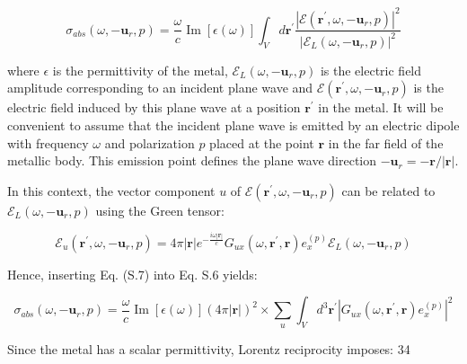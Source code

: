 \documentclass[10pt]{article}
\begin{document}
\begin{equation*}
\sigma_{a b s}\left(\omega,-\boldsymbol{u}_{r}, p\right)=\frac{\omega}{c} \operatorname{Im}[\epsilon(\omega)] \int_{V} d \boldsymbol{r}^{\prime} \frac{\left|\mathcal{E}\left(\boldsymbol{r}^{\prime}, \omega,-\boldsymbol{u}_{r}, p\right)\right|^{2}}{\left|\mathcal{E}_{L}\left(\omega,-\boldsymbol{u}_{r}, p\right)\right|^{2}} \tag{S.6}
\end{equation*}


where $\epsilon$ is the permittivity of the metal, $\mathcal{E}_{L}\left(\omega,-\boldsymbol{u}_{r}, p\right)$ is the electric field amplitude corresponding to an incident plane wave and $\mathcal{E}\left(\boldsymbol{r}^{\prime}, \omega,-\boldsymbol{u}_{r}, p\right)$ is the electric field induced by this plane wave at a position $\boldsymbol{r}^{\prime}$ in the metal. It will be convenient to assume that the incident plane wave is emitted by an electric dipole with frequency $\omega$ and polarization $p$ placed at the point $\boldsymbol{r}$ in the far field of the metallic body. This emission point defines the plane wave direction $-\boldsymbol{u}_{r}=-\boldsymbol{r} /|\boldsymbol{r}|$.

In this context, the vector component $u$ of $\mathcal{E}\left(\boldsymbol{r}^{\prime}, \omega,-\boldsymbol{u}_{r}, p\right)$ can be related to $\mathcal{E}_{L}\left(\omega,-\boldsymbol{u}_{r}, p\right)$ using the Green tensor:


\begin{equation*}
\mathcal{E}_{u}\left(\boldsymbol{r}^{\prime}, \omega,-\boldsymbol{u}_{r}, p\right)=4 \pi|\boldsymbol{r}| e^{-\frac{i \omega|\boldsymbol{r}|}{c}} G_{u x}\left(\omega, \boldsymbol{r}^{\prime}, \boldsymbol{r}\right) e_{x}^{(p)} \mathcal{E}_{L}\left(\omega,-\boldsymbol{u}_{r}, p\right) \tag{S.7}
\end{equation*}


Hence, inserting Eq. (S.7) into Eq. S.6 yields:


\begin{equation*}
\sigma_{a b s}\left(\omega,-\boldsymbol{u}_{r}, p\right)=\frac{\omega}{c} \operatorname{Im}[\epsilon(\omega)](4 \pi|\boldsymbol{r}|)^{2} \times \sum_{u} \int_{V} d^{3} \boldsymbol{r}^{\prime}\left|G_{u x}\left(\omega, \boldsymbol{r}^{\prime}, \boldsymbol{r}\right) e_{x}^{(p)}\right|^{2} \tag{S.8}
\end{equation*}


Since the metal has a scalar permittivity, Lorentz reciprocity imposes: 34
\end{document}
